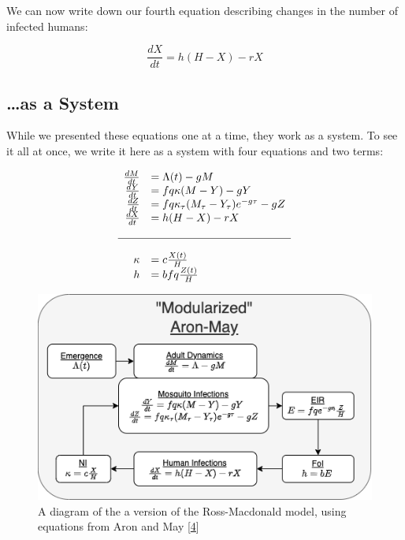 \documentclass[
]{book}
\begin{document}
We can now write down our fourth equation describing changes in the number of infected humans:

\begin{equation}
\frac{dX}{dt} = h (H-X) - r X 
\end{equation}

\hypertarget{as-a-system}{%
\subsection{\ldots as a System}\label{as-a-system}}

While we presented these equations one at a time, they work as a system. To see it all at once, we write it here as a system with four equations and two terms:

\begin{equation}
\begin{array}{rl}
\frac{dM}{dt} &= \Lambda(t) - g M \\
\frac{dY}{dt} &= fq\kappa(M-Y) - g Y \\
\frac{dZ}{dt} &= fq\kappa_\tau(M_\tau-Y_\tau)e^{-g\tau} - g Z \\
\frac{dX}{dt} &= h (H-X) - rX  \\ \\ \hline \\ 
\kappa &= c \frac{X(t)}{H} \\
h &= b fq \frac{Z(t)}{H} \\
\end{array}
\end{equation}

\begin{figure}
\centering
\includegraphics{../Figures/AronMay.png}
\caption{A diagram of the a version of the Ross-Macdonald model, using equations from Aron and May {[}\protect\hyperlink{ref-AronJL1982PopulationDynamics}{4}{]}}
\end{figure}
\end{document}
